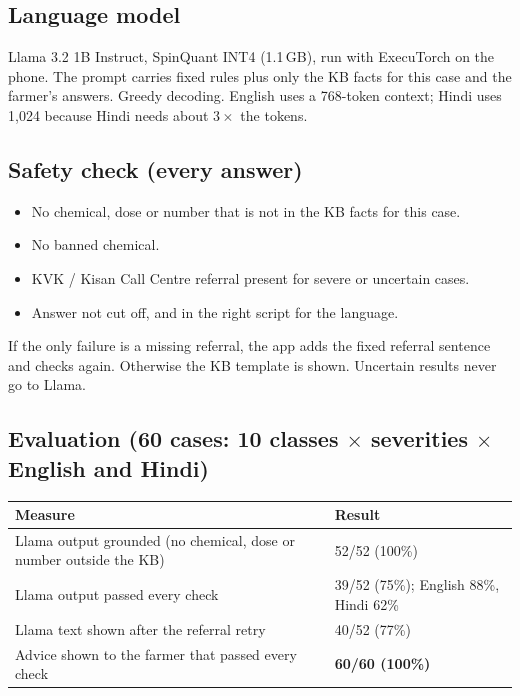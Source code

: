 \documentclass[11pt,a4paper]{article}
\newcommand{\hdr}[1]{\textbf{#1}}
\begin{document}
\subsection{Language model}

Llama 3.2 1B Instruct, SpinQuant INT4 (1.1\,GB), run with ExecuTorch on the phone.
The prompt carries fixed rules plus only the KB facts for this case and the
farmer's answers. Greedy decoding. English uses a 768-token context; Hindi uses
1,024 because Hindi needs about $3\times$ the tokens.

\subsection{Safety check (every answer)}

\begin{itemize}
  \item No chemical, dose or number that is not in the KB facts for this case.
  \item No banned chemical.
  \item KVK / Kisan Call Centre referral present for severe or uncertain cases.
  \item Answer not cut off, and in the right script for the language.
\end{itemize}

If the only failure is a missing referral, the app adds the fixed referral
sentence and checks again. Otherwise the KB template is shown. Uncertain results
never go to Llama.

\subsection{Evaluation (60 cases: 10 classes $\times$ severities $\times$ English and Hindi)}

\begin{table}[H]
\centering
\begin{tabularx}{\textwidth}{@{}L l@{}}
\toprule
\hdr{Measure} & \hdr{Result} \\
\midrule
Llama output grounded (no chemical, dose or number outside the KB) & 52/52 (100\%) \\
Llama output passed every check & 39/52 (75\%); English 88\%, Hindi 62\% \\
Llama text shown after the referral retry & 40/52 (77\%) \\
Advice shown to the farmer that passed every check & \textbf{60/60 (100\%)} \\
\bottomrule
\end{tabularx}
\end{table}
\end{document}
